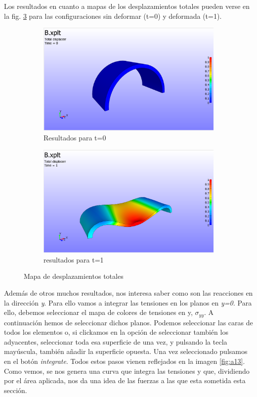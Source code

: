 Los resultados en cuanto a mapas de los desplazamientos totales pueden verse en la fig. \ref{fig:a11-12} para las configuraciones sin deformar (t=0) y deformada (t=1). 

\begin{figure}[!htp]
\centering
\begin{subfigure}[b]{0.48\textwidth}
\centering
\includegraphics[width=\textwidth]{figuras_3/a_p1.png}
\caption{Resultados para t=0}
\label{fig:a11}
\end{subfigure}
\begin{subfigure}[b]{0.48\textwidth}
\centering
\includegraphics[width=\textwidth]{figuras_3/a_p2.png}
\caption{resultados para t=1}
\label{fig:a12}
\end{subfigure}
\caption{Mapa de desplazamientos totales}
\label{fig:a11-12}
\end{figure}

Además de otros muchos resultados, nos interesa saber como son las reacciones en la dirección \emph{y}. Para ello vamos a integrar las tensiones en los planos en \textit{y=0.} Para ello, debemos seleccionar el mapa de colores de tensiones en y, $\sigma_{yy}$. A continuación hemos de seleccionar dichos planos. Podemos seleccionar las caras de todos los elementos o, si clickamos en la opción de seleccionar también los adyacentes, seleccionar toda esa superficie de una vez, y pulsando la tecla mayúscula, también añadir la superficie opuesta. Una vez seleccionado pulsamos en el botón \emph{integrate}. Todos estos pasos vienen reflejados en la imagen \ref{fig:a13}. Como vemos, se nos genera una curva que integra las tensiones y que, dividiendo por el área aplicada, nos da una idea de las fuerzas a las que esta sometida esta sección.

